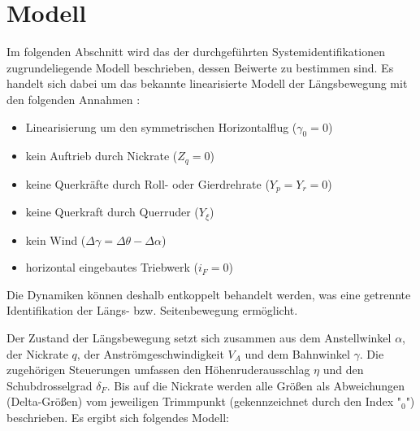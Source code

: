 \chapter{Modell}
Im folgenden Abschnitt wird das der durchgeführten Systemidentifikationen zugrundeliegende Modell beschrieben, dessen 
Beiwerte zu bestimmen sind. Es handelt sich dabei um das bekannte linearisierte Modell der Längsbewegung mit 
den folgenden Annahmen \cite{Fichter2009}:

\begin{itemize}
	\item Linearisierung um den symmetrischen Horizontalflug ($ \gamma_0=0 $)
	\item kein Auftrieb durch Nickrate ($ Z_q=0 $)
	\item keine Querkräfte durch Roll- oder Gierdrehrate ($ Y_p=Y_r=0 $)
	\item keine Querkraft durch Querruder ($ Y_\xi $)
	\item kein Wind ($ \Delta\gamma = \Delta\theta-\Delta\alpha $)
	\item horizontal eingebautes Triebwerk ($ i_F=0 $)
\end{itemize} 

Die Dynamiken können deshalb entkoppelt behandelt werden, was eine getrennte Identifikation der Längs- bzw. Seitenbewegung 
ermöglicht. %

Der Zustand der Längsbewegung setzt sich zusammen aus dem Anstellwinkel $ \alpha $, der Nickrate $ q $, der 
Anströmgeschwindigkeit $ V_A $ und dem Bahnwinkel $ \gamma $. Die zugehörigen Steuerungen umfassen den Höhenruderausschlag $ 
\eta $ und den Schubdrosselgrad $ \delta_F $. Bis auf die Nickrate werden alle Größen als Abweichungen (Delta-Größen) vom 
jeweiligen Trimmpunkt (gekennzeichnet durch den Index "$ _0 $") beschrieben. Es ergibt sich folgendes Modell:

